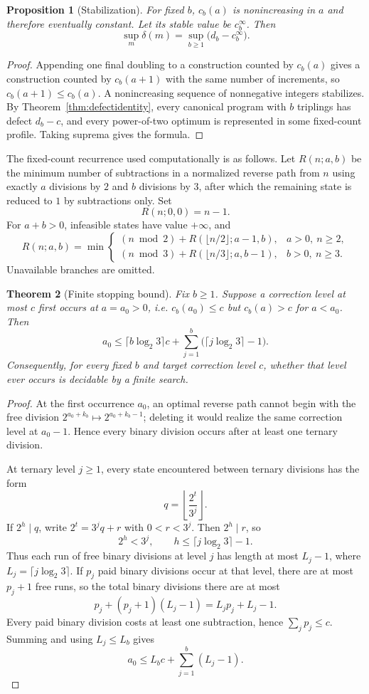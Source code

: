 \documentclass[11pt]{article}
\newtheorem{theorem}{Theorem}[section]
\newtheorem{proposition}[theorem]{Proposition}
\begin{document}
\begin{proposition}[Stabilization]\label{prop:stabilization}
For fixed $b$, $c_b(a)$ is nonincreasing in $a$ and therefore eventually constant. Let its stable value be $c_b^\infty$. Then
\[
 \boxed{\sup_m\delta(m)=\sup_{b\ge1}\bigl(d_b-c_b^\infty\bigr).}
\]
\end{proposition}
\begin{proof}
Appending one final doubling to a construction counted by $c_b(a)$ gives a construction counted by $c_b(a+1)$ with the same number of increments, so $c_b(a+1)\le c_b(a)$. A nonincreasing sequence of nonnegative integers stabilizes. By Theorem~\ref{thm:defectidentity}, every canonical program with $b$ triplings has defect $d_b-c$, and every power-of-two optimum is represented in some fixed-count profile. Taking suprema gives the formula.
\end{proof}

The fixed-count recurrence used computationally is as follows. Let $R(n;a,b)$ be the minimum number of subtractions in a normalized reverse path from $n$ using exactly $a$ divisions by $2$ and $b$ divisions by $3$, after which the remaining state is reduced to $1$ by subtractions only. Set
\[
 R(n;0,0)=n-1.
\]
For $a+b>0$, infeasible states have value $+\infty$, and
\[
 R(n;a,b)=\min\begin{cases}
 (n\bmod2)+R(\lfloor n/2\rfloor;a-1,b),&a>0,\ n\ge2,\\
 (n\bmod3)+R(\lfloor n/3\rfloor;a,b-1),&b>0,\ n\ge3.
 \end{cases}
\]
Unavailable branches are omitted.

\begin{theorem}[Finite stopping bound]\label{thm:stopping}
Fix $b\ge1$. Suppose a correction level at most $c$ first occurs at $a=a_0>0$, i.e. $c_b(a_0)\le c$ but $c_b(a)>c$ for $a<a_0$. Then
\[
 \boxed{
 a_0\le \lceil b\log_2 3\rceil c+
 \sum_{j=1}^{b}\bigl(\lceil j\log_2 3\rceil-1\bigr).}
\]
Consequently, for every fixed $b$ and target correction level $c$, whether that level ever occurs is decidable by a finite search.
\end{theorem}
\begin{proof}
At the first occurrence $a_0$, an optimal reverse path cannot begin with the free division $2^{a_0+k_b}\mapsto2^{a_0+k_b-1}$; deleting it would realize the same correction level at $a_0-1$. Hence every binary division occurs after at least one ternary division.

At ternary level $j\ge1$, every state encountered between ternary divisions has the form
\[
 q=\left\lfloor\frac{2^t}{3^j}\right\rfloor.
\]
If $2^h\mid q$, write $2^t=3^jq+r$ with $0<r<3^j$. Then $2^h\mid r$, so
\[
 2^h<3^j,
\qquad
 h\le\lceil j\log_2 3\rceil-1.
\]
Thus each run of free binary divisions at level $j$ has length at most $L_j-1$, where $L_j=\lceil j\log_2 3\rceil$. If $p_j$ paid binary divisions occur at that level, there are at most $p_j+1$ free runs, so the total binary divisions there are at most
\[
 p_j+(p_j+1)(L_j-1)=L_jp_j+L_j-1.
\]
Every paid binary division costs at least one subtraction, hence $\sum_jp_j\le c$. Summing and using $L_j\le L_b$ gives
\[
 a_0\le L_b c+\sum_{j=1}^b(L_j-1).
\]
\end{proof}
\end{document}
